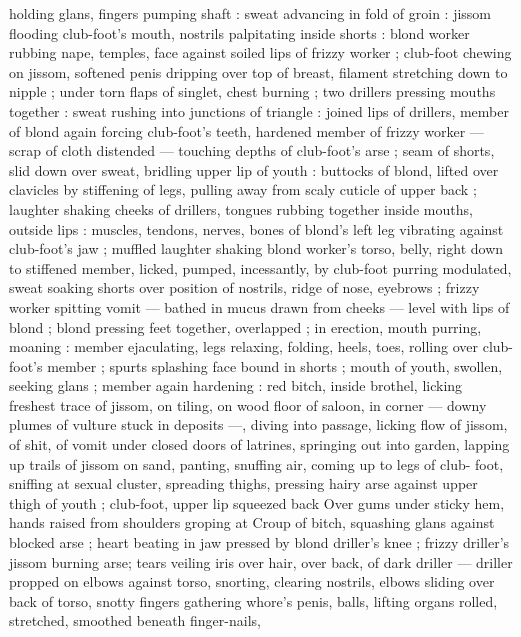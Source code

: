 holding glans, fingers pumping shaft : sweat advancing in fold of 
groin : jissom flooding club-foot's mouth, nostrils palpitating inside 
shorts : blond worker rubbing nape, temples, face against soiled lips 
of frizzy worker ; club-foot chewing on jissom, softened penis 
dripping over top of breast, filament stretching down to nipple ; 
under torn flaps of singlet, chest burning ; two drillers pressing 
mouths together : sweat rushing into junctions of triangle : joined 
lips of drillers, member of blond again forcing club-foot's teeth, 
hardened member of frizzy worker --- scrap of cloth distended --- 
touching depths of club-foot's arse ; seam of shorts, slid down over 
sweat, bridling upper lip of youth : buttocks of blond, lifted over 
clavicles by stiffening of legs, pulling away from scaly cuticle of 
upper back ; laughter shaking cheeks of drillers, tongues rubbing 
together inside mouths, outside lips : muscles, tendons, nerves, 
bones of blond's left leg vibrating against club-foot's jaw ; muffled 
laughter shaking blond worker's torso, belly, right down to stiffened 
member, licked, pumped, incessantly, by club-foot purring 
modulated, sweat soaking shorts over position of nostrils, ridge of 
nose, eyebrows ; frizzy worker spitting vomit --- bathed in mucus 
drawn from cheeks --- level with lips of blond ; blond pressing feet 
together, overlapped ; in erection, mouth purring, moaning : member 
ejaculating, legs relaxing, folding, heels, toes, rolling over club-foot's 
member ; spurts splashing face bound in shorts ; mouth of youth, 
swollen, seeking glans ; member again hardening : red bitch, inside 
brothel, licking freshest trace of jissom, on tiling, on wood floor of 
saloon, in corner --- downy plumes of vulture stuck in deposits ---, 
diving into passage, licking flow of jissom, of shit, of vomit under 
closed doors of latrines, springing out into garden, lapping up trails 
of jissom on sand, panting, snuffing air, coming up to legs of club- 
foot, sniffing at sexual cluster, spreading thighs, pressing hairy arse 
against upper thigh of youth ; club-foot, upper lip squeezed back 
Over gums under sticky hem, hands raised from shoulders groping at 
Croup of bitch, squashing glans against blocked arse ; heart beating 
in jaw pressed by blond driller's knee ; frizzy driller's jissom burning 
arse; tears veiling iris over hair, over back, of dark driller --- driller 
propped on elbows against torso, snorting, clearing nostrils, elbows 
sliding over back of torso, snotty fingers gathering whore's penis, 
balls, lifting organs rolled, stretched, smoothed beneath finger-nails, 
